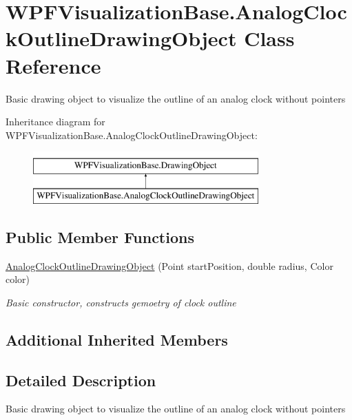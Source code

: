 \hypertarget{class_w_p_f_visualization_base_1_1_analog_clock_outline_drawing_object}{}\section{W\+P\+F\+Visualization\+Base.\+Analog\+Clock\+Outline\+Drawing\+Object Class Reference}
\label{class_w_p_f_visualization_base_1_1_analog_clock_outline_drawing_object}


Basic drawing object to visualize the outline of an analog clock without pointers  


Inheritance diagram for W\+P\+F\+Visualization\+Base.\+Analog\+Clock\+Outline\+Drawing\+Object\+:\begin{figure}[H]
\begin{center}
\leavevmode
\includegraphics[height=2.000000cm]{class_w_p_f_visualization_base_1_1_analog_clock_outline_drawing_object}
\end{center}
\end{figure}
\subsection*{Public Member Functions}
\begin{DoxyCompactItemize}
\item 
\hyperlink{class_w_p_f_visualization_base_1_1_analog_clock_outline_drawing_object_a2847237fd6ae2026c167e0877a39a990}{Analog\+Clock\+Outline\+Drawing\+Object} (Point start\+Position, double radius, Color color)
\begin{DoxyCompactList}\small\item\em Basic constructor, constructs gemoetry of clock outline \end{DoxyCompactList}\end{DoxyCompactItemize}
\subsection*{Additional Inherited Members}


\subsection{Detailed Description}
Basic drawing object to visualize the outline of an analog clock without pointers 



